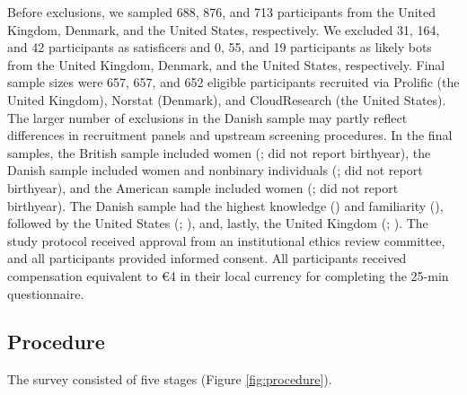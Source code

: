 Before exclusions, we sampled 688, 876, and 713 participants from the United Kingdom, Denmark, and the United States, respectively. We excluded 31, 164, and 42 participants as satisficers and 0, 55, and 19 participants as likely bots from the United Kingdom, Denmark, and the United States, respectively. Final sample sizes were 657, 657, and 652 eligible participants recruited via Prolific (the United Kingdom), Norstat (Denmark), and CloudResearch (the United States). The larger number of exclusions in the Danish sample may partly reflect differences in recruitment panels and upstream screening procedures. In the final samples, the British sample included  women (;  did not report birthyear), the Danish sample included  women and  nonbinary individuals (;  did not report birthyear), and the American sample included  women (;  did not report birthyear). 
The Danish sample had the highest knowledge () and familiarity (), followed by the United States (; 
), and, lastly, the United Kingdom (; ). The study protocol received approval from an institutional ethics review committee, and all participants provided informed consent. All participants received compensation equivalent to €4 in their local currency for completing the 25-min questionnaire.

\subsection{Procedure}
The survey consisted of five stages (Figure \ref{fig:procedure}).

